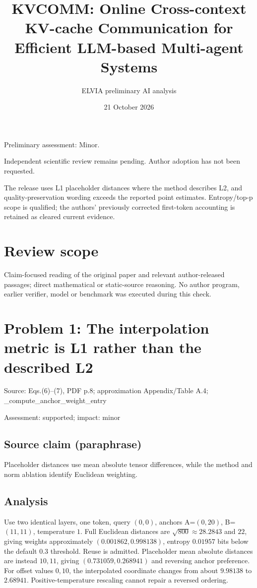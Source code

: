 \documentclass[11pt]{article}
\begin{document}
\title{KVCOMM: Online Cross-context KV-cache Communication for Efficient LLM-based Multi-agent Systems}

\author{ELVIA preliminary AI analysis}\date{21 October 2026}\maketitle

Preliminary assessment: Minor.\par

Independent scientific review remains pending. Author adoption has not been requested.

The release uses L1 placeholder distances where the method describes L2, and quality-preservation wording exceeds the reported point estimates. Entropy/top-p scope is qualified; the authors’ previously corrected first-token accounting is retained as cleared current evidence.

\section*{Review scope}

Claim-focused reading of the original paper and relevant author-released passages; direct mathematical or static-source reasoning. No author program, earlier verifier, model or benchmark was executed during this check.

\section*{Problem 1: The interpolation metric is L1 rather than the described L2}

Source: Eqs.(6)–(7), PDF p.8; approximation Appendix/Table A.4; \_compute\_anchor\_weight\_entry

Assessment: supported; impact: minor

\subsection*{Source claim (paraphrase)}

Placeholder distances use mean absolute tensor differences, while the method and norm ablation identify Euclidean weighting.

\subsection*{Analysis}

Use two identical layers, one token, query \((0,0)\), anchors A=\((0,20)\), B=\((11,11)\), temperature \(1\). Full Euclidean distances are \(\sqrt{800}\approx28.2843\) and \(22\), giving weights approximately \((0.001862,0.998138)\), entropy \(0.01957\) bits below the default \(0.3\) threshold. Reuse is admitted. Placeholder mean absolute distances are instead \(10,11\), giving \((0.731059,0.268941)\) and reversing anchor preference. For offset values \(0,10\), the interpolated coordinate changes from about \(9.98138\) to \(2.68941\). Positive-temperature rescaling cannot repair a reversed ordering.
\end{document}
